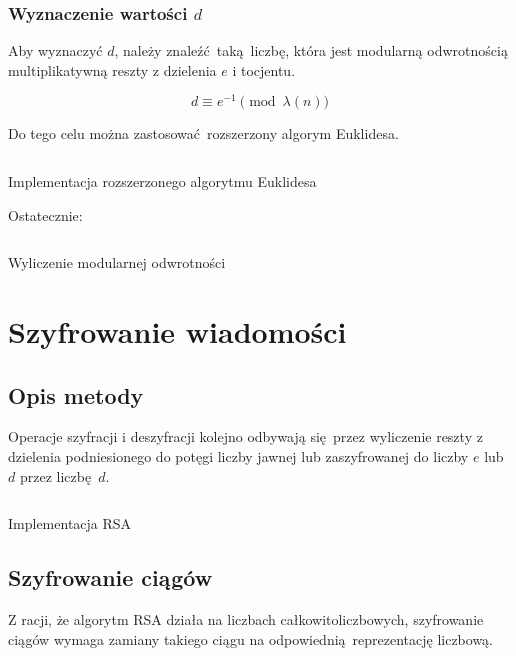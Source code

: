 \documentclass[12pt]{article}
\begin{document}
\subsubsection{Wyznaczenie wartości $d$}

Aby wyznaczyć $d$, należy znaleźć taką liczbę,
która jest modularną odwrotnością multiplikatywną
reszty z dzielenia $e$ i tocjentu.

\begin{equation}
	d \equiv e^{{-1}} \pmod{\lambda (n)}
\end{equation}

Do tego celu można zastosować rozszerzony algorym Euklidesa.

\begin{listing}[H]
	\inputminted[firstline=32,lastline=42]{python}{../rsa.py}
	\caption{Implementacja rozszerzonego algorytmu Euklidesa}
\end{listing}

Ostatecznie:

\begin{listing}[H]
	\inputminted[firstline=28,lastline=30]{python}{../rsa.py}
	\caption{Wyliczenie modularnej odwrotności}
\end{listing}

\section{Szyfrowanie wiadomości}

\subsection{Opis metody}
Operacje szyfracji i deszyfracji kolejno odbywają się przez
wyliczenie reszty z dzielenia
podniesionego do potęgi liczby jawnej lub zaszyfrowanej do
liczby $e$ lub $d$ 
przez liczbę $d$.

\begin{listing}[H]
	\inputminted[firstline=75,lastline=79]{python}{../rsa.py}
	\caption{Implementacja RSA}
\end{listing}

\newpage

\subsection{Szyfrowanie ciągów}

Z racji, że algorytm RSA działa na liczbach całkowitoliczbowych,
szyfrowanie ciągów wymaga zamiany takiego ciągu na odpowiednią reprezentację
liczbową.
\\
\end{document}
